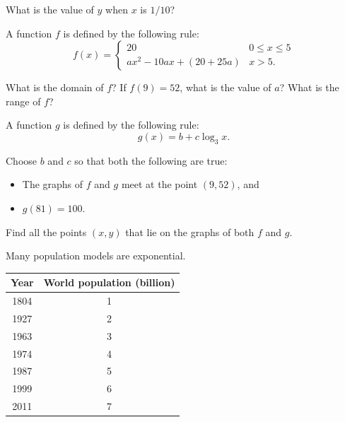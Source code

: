 \begin{questions}
            What is the value of $ y $ when $ x $ is $ 1/10 $?
  \question
    \begin{parts}
      \item A function $ f $ is defined by the following rule:
            \begin{displaymath}
              f(x) = \begin{cases}
                      20 & 0 \leq x \leq 5\\
                      ax^2 - 10ax + (20 + 25a) & x > 5.
                    \end{cases}
            \end{displaymath}
        \begin{subparts}
          \subpart What is the domain of $ f $?
          \subpart If $ f(9) = 52 $, what is the value of $ a $?
          \subpart What is the range of $ f $?
        \end{subparts}
      \item A function $ g $ is defined by the following rule:
            \begin{displaymath}
              g(x) = b + c\log_3 x.
            \end{displaymath}
        \begin{subparts}
          \subpart Choose $ b $ and $ c $ so that both the following are true:
            \begin{itemize}
              \item The graphs of $ f $ and $ g $ meet at the point $ (9,52) $, and
              \item $ g(81) = 100 $.
            \end{itemize}
          \subpart Find all the points $ (x,y) $ that lie on the graphs of both $ f $ and $ g $.
        \end{subparts}
    \end{parts}
  \question Many population models are exponential.
            \begin{center}
              \begin{tabular}{|c|c|}\hline
                \textbf{Year} & \textbf{World population (billion)}\\\hline
                1804 & 1\\\hline
                1927 & 2\\\hline
                1963 & 3\\\hline
                1974 & 4\\\hline
                1987 & 5\\\hline
                1999 & 6\\\hline
                2011 & 7\\\hline
              \end{tabular}
            \end{center}
    \begin{parts}

\end{parts}
\end{questions}
